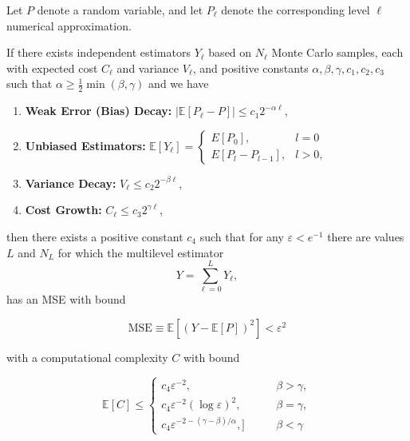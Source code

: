 \begin{theorem}\label{theorem:mlmc_complexity}
    Let $P$ denote a random variable, and let $P_\ell$ denote the corresponding 
    level $\ell$ numerical approximation. 

    If there exists independent estimators $Y_\ell$ based on $N_\ell$ Monte Carlo
    samples, each with expected cost $C_\ell$ and variance $V_\ell$, and 
    positive constants $\alpha, \beta, \gamma,c_1, c_2, c_3$ such that 
    $\alpha \geq \frac{1}{2} \min(\beta, \gamma)$ and we have
    \begin{enumerate}
        \item \textbf{Weak Error (Bias) Decay: } $|\mathbb{E}[P_\ell - P]| \leq c_1 2^{-\alpha \ell}$,
        \item \textbf{Unbiased Estimators: } $\mathbb{E}[Y_\ell] = 
        \begin{cases}
            E[P_0], & l = 0 \\
            E[P_l - P_{l-1}], & l > 0,
        \end{cases}
        $
        \item \textbf{Variance Decay: } $V_\ell \leq c_2 2^{-\beta \ell}$,
        \item \textbf{Cost Growth: } $C_\ell \leq c_3 2^{\gamma \ell}$,
    \end{enumerate}
    then there exists a positive constant $c_4$ such that for any $\varepsilon < e^{-1}$ there
    are values $L$ and $N_L$ for which the multilevel estimator 
    \begin{equation*}
        Y = \sum_{\ell = 0}^L Y_\ell,
    \end{equation*}
    has an MSE with bound 

    \begin{equation}
        \text{MSE} \equiv \mathbb{E}\left[(Y - \mathbb{E}[P])^2\right] < \varepsilon^2
    \end{equation}

    with a computational complexity $C$ with bound

    \begin{equation}
        \mathbb{E}[C] \leq
        \begin{cases}
            c_4 \varepsilon^{-2}, \qquad &\beta > \gamma,\\
            c_4\varepsilon^{-2}(\log \varepsilon)^2, \qquad &\beta = \gamma,\\
            c_4\varepsilon^{-2-(\gamma - \beta)/\alpha}, ]\qquad &\beta < \gamma
        \end{cases}
    \end{equation}
\end{theorem}

